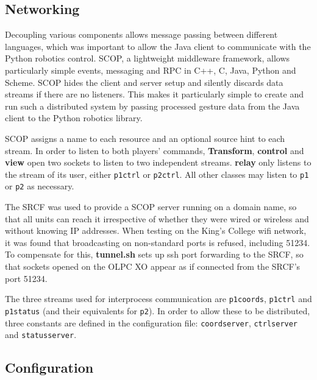 \documentclass[12pt,a4,notitlepage]{report}
\renewcommand{\_}{\texttt{\symbol{95}}}
\newcommand{\<}{\texttt{\symbol{60}}}
\renewcommand{\>}{\texttt{\symbol{62}}}
\newcommand{\class}[1]{\textbf{#1}}
\newcommand{\scopendpoint}[1]{\texttt{#1}}
\newcommand{\variable}[1]{\texttt{#1}}
\begin{document}
\subsection{Networking}

Decoupling various components allows message passing between different languages, which was important to allow the Java client to communicate with the Python robotics control. SCOP, a lightweight middleware framework, allows particularly simple events, messaging and RPC in C++, C, Java, Python and Scheme. SCOP hides the client and server setup and silently discards data streams if there are no listeners. This makes it particularly simple to create and run such a distributed system by passing processed gesture data from the Java client to the Python robotics library.

SCOP assigns a name to each resource and an optional source hint to each stream. In order to listen to both players' commands, \class{Transform}, \class{control} and \class{view} open two sockets to listen to two independent streams. \class{relay} only listens to the stream of its user, either \scopendpoint{p1ctrl} or \scopendpoint{p2ctrl}. All other classes may listen to \scopendpoint{p1} or \scopendpoint{p2} as necessary.

The SRCF was used to provide a SCOP server running on a domain name, so that all units can reach it irrespective of whether they were wired or wireless and without knowing IP addresses. When testing on the King's College wifi network, it was found that broadcasting on non-standard ports is refused, including 51234. To compensate for this, \class{tunnel.sh} sets up ssh port forwarding to the SRCF, so that sockets opened on the OLPC XO appear as if connected from the SRCF's port 51234.

The three streams used for interprocess communication are \scopendpoint{p1coords}, \scopendpoint{p1ctrl} and \scopendpoint{p1status} (and their equivalents for \scopendpoint{p2}). In order to allow these to be distributed, three constants are defined in the configuration file: \variable{coordserver}, \variable{ctrlserver} and \variable{statusserver}. 

\subsection{Configuration}
\end{document}

